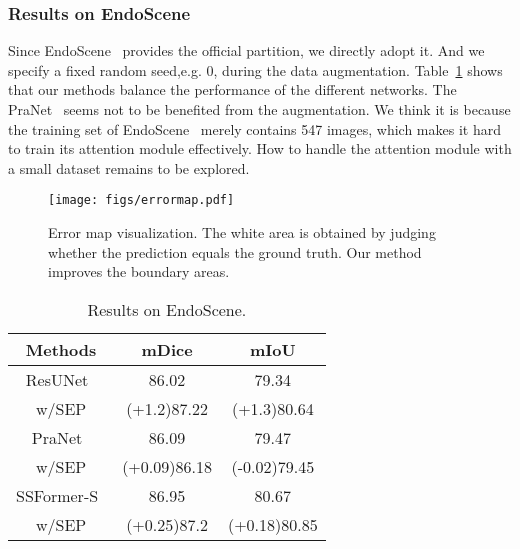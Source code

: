 \documentclass{article}
\begin{document}
\vspace{-0.4cm}

\subsubsection{Results on EndoScene}
Since EndoScene~\cite{endoscene} provides the official partition, we directly adopt it. And we specify a fixed random seed,e.g. 0, during the data augmentation. Table~\ref{tab:cvcdb} shows that our methods balance the performance of the different networks. The PraNet~\cite{pranet} seems not to be benefited from the augmentation. We think it is because the training set of EndoScene~\cite{endoscene} merely contains 547 images, which makes it hard to train its attention module effectively. How to handle the attention module with a small dataset remains to be explored.


\begin{figure}[t]
    \centerline{\texttt{[image: figs/errormap.pdf]}}
\vspace{-0.3cm}
\caption{Error map visualization. The white area is obtained by judging whether the prediction equals the ground truth. Our method improves the boundary areas.}
\label{fig:errormap}
\end{figure}

\begin{table}[tbp]
\begin{center}
    \caption{Results on EndoScene.}\label{tab:cvcdb}
\begin{tabular}{c|cc}
\hline
Methods &  mDice & mIoU \\ \hline

ResUNet~\cite{resunet} &86.02&79.34\\
w/SEP &\textcolor[rgb]{0,0,1}{(+1.2)}87.22&\textcolor[rgb]{0,0,1}{(+1.3)}80.64\\\hline
PraNet~\cite{pranet} &86.09&79.47\\
w/SEP &\textcolor[rgb]{0,0,1}{(+0.09)}86.18&\textcolor[rgb]{1,0,0}{(-0.02)}79.45\\\hline

SSFormer-S~\cite{ssformer} &86.95&80.67\\
w/SEP &\textcolor[rgb]{0,0,1}{(+0.25)}87.2&\textcolor[rgb]{0,0,1}{(+0.18)}80.85\\\hline

\end{tabular}
\end{center}
\end{table}
\end{document}
